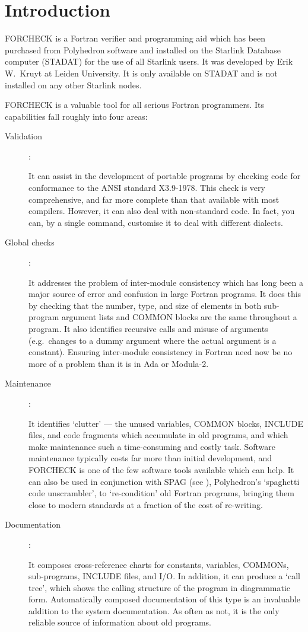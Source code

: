\documentclass[11pt,twoside,nolof,noabs]{starlink}
\begin{document}
\scfrontmatter

\section{Introduction}

FORCHECK is a Fortran verifier and programming aid which has been purchased
from Polyhedron software and installed on the Starlink Database computer
(STADAT) for the use of all Starlink users.
It was developed by Erik W.\ Kruyt at Leiden University.
It is only available on STADAT and is not installed on any other Starlink
nodes.

FORCHECK is a valuable tool for all serious Fortran programmers.
Its capabilities fall roughly into four areas:
\begin{description}
\item [Validation]:

It can assist in the development of portable programs by checking code for
conformance to the ANSI standard X3.9-1978.
This check is very comprehensive, and far more complete than that available
with most compilers.
However, it can also deal with non-standard code.
In fact, you can, by a single command, customise it to deal with
different dialects.

\item [Global checks]:

It addresses the problem of inter-module consistency which has long been a
major source of error and confusion in large Fortran programs.
It does this by checking that the number, type, and size of elements in both
sub-program argument lists and COMMON blocks are the same throughout a program.
It also identifies recursive calls and misuse of arguments (e.g.\ changes
to a dummy argument where the actual argument is a constant).
Ensuring inter-module consistency in Fortran need now be no more of a problem
than it is in Ada or Modula-2.

\item [Maintenance]:

It identifies `clutter' --- the unused variables, COMMON blocks, INCLUDE files,
and code fragments which accumulate in old programs, and which make maintenance
such a time-consuming and costly task.
Software maintenance typically costs far more than initial development, and
FORCHECK is one of the few software tools available which can help.
It can also be used in conjunction with SPAG
(see ), Polyhedron's
`spaghetti code unscrambler', to `re-condition' old Fortran programs, bringing
them close to modern standards at a fraction of the cost of re-writing.

\item [Documentation]:

It composes cross-reference charts for constants, variables, COMMONs,
sub-programs, INCLUDE files, and I/O.
In addition, it can produce a `call tree', which shows the calling structure
of the program in diagrammatic form.
Automatically composed documentation of this type is an invaluable addition
to the system documentation.
As often as not, it is the only reliable source of information about old
programs.
\end{description}
\end{document}

